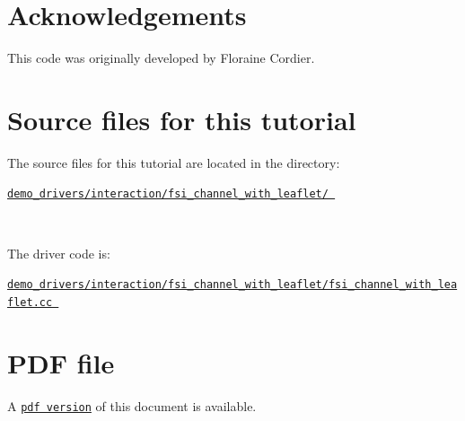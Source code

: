  \hypertarget{index_ackn}{}\section{Acknowledgements}\label{index_ackn}

\begin{DoxyItemize}
\item This code was originally developed by Floraine Cordier.
\end{DoxyItemize}



 

\hypertarget{index_sources}{}\section{Source files for this tutorial}\label{index_sources}

\begin{DoxyItemize}
\item The source files for this tutorial are located in the directory\+:~\newline
~\newline
\begin{center} \href{
../../../../
demo_drivers/interaction/fsi_channel_with_leaflet/
}{\tt demo\+\_\+drivers/interaction/fsi\+\_\+channel\+\_\+with\+\_\+leaflet/ } \end{center} ~\newline

\item The driver code is\+: ~\newline
~\newline
\begin{center} \href{
../../../../
demo_drivers/interaction/fsi_channel_with_leaflet/fsi_channel_with_leaflet.cc
}{\tt demo\+\_\+drivers/interaction/fsi\+\_\+channel\+\_\+with\+\_\+leaflet/fsi\+\_\+channel\+\_\+with\+\_\+leaflet.\+cc } \end{center} 
\end{DoxyItemize}

 

 \hypertarget{index_pdf}{}\section{P\+D\+F file}\label{index_pdf}
A \href{../latex/refman.pdf}{\tt pdf version} of this document is available. 
